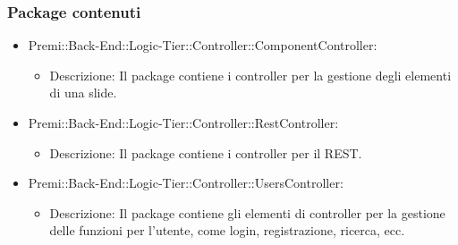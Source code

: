 	\subsubsection*{Package contenuti}
		\begin{itemize}
			\item Premi::Back-End::Logic-Tier::Controller::ComponentController:
			\begin{itemize}
				\item Descrizione: Il package contiene i controller per la gestione degli elementi di una slide.
			\end{itemize}
			
			\item Premi::Back-End::Logic-Tier::Controller::RestController:
			\begin{itemize}
				\item Descrizione: Il package contiene i controller per il REST.
			\end{itemize}
			
			\item Premi::Back-End::Logic-Tier::Controller::UsersController:
			\begin{itemize}
				\item Descrizione: Il package contiene gli elementi di controller per la gestione delle funzioni per l'utente, come login, registrazione, ricerca, ecc.
			\end{itemize}
		\end{itemize}
		
